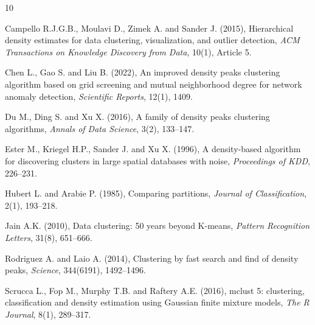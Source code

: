 \documentclass[10pt,twoside]{article}
\numberwithin{equation}{section}
\begin{document}
\begin{thebibliography}{10}

	

	


	Campello R.J.G.B., Moulavi D., Zimek A. and Sander J. (2015), Hierarchical density estimates for data clustering, visualization, and outlier detection, {\it ACM Transactions on Knowledge Discovery from Data}, 10(1), Article 5.

	


	Chen L., Gao S. and Liu B. (2022), An improved density peaks clustering algorithm based on grid screening and mutual neighborhood degree for network anomaly detection, {\it Scientific Reports}, 12(1), 1409.

	


	Du M., Ding S. and Xu X. (2016), A family of density peaks clustering algorithms, {\it Annals of Data Science}, 3(2), 133--147.

	


	Ester M., Kriegel H.P., Sander J. and Xu X. (1996), A density-based algorithm for discovering clusters in large spatial databases with noise, {\it Proceedings of KDD}, 226--231.

	


	Hubert L. and Arabie P. (1985), Comparing partitions, {\it Journal of Classification}, 2(1), 193--218.

	


	Jain A.K. (2010), Data clustering: 50 years beyond K-means, {\it Pattern Recognition Letters}, 31(8), 651--666.

	

	


	Rodriguez A. and Laio A. (2014), Clustering by fast search and find of density peaks, {\it Science}, 344(6191), 1492--1496.

	


	Scrucca L., Fop M., Murphy T.B. and Raftery A.E. (2016), mclust 5: clustering, classification and density estimation using Gaussian finite mixture models, {\it The R Journal}, 8(1), 289--317.


\end{thebibliography}
\end{document}

